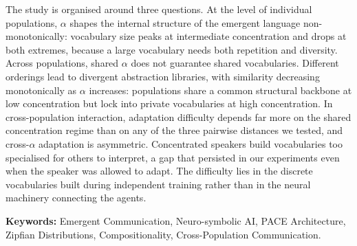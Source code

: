 The study is organised around three questions. At the level of individual populations, $\alpha$ shapes the internal structure of the emergent language non-monotonically: vocabulary size peaks at intermediate concentration and drops at both extremes, because a large vocabulary needs both repetition and diversity. Across populations, shared $\alpha$ does not guarantee shared vocabularies. Different orderings lead to divergent abstraction libraries, with similarity decreasing monotonically as $\alpha$ increases: populations share a common structural backbone at low concentration but lock into private vocabularies at high concentration. In cross-population interaction, adaptation difficulty depends far more on the shared concentration regime than on any of the three pairwise distances we tested, and cross-$\alpha$ adaptation is asymmetric. Concentrated speakers build vocabularies too specialised for others to interpret, a gap that persisted in our experiments even when the speaker was allowed to adapt. The difficulty lies in the discrete vocabularies built during independent training rather than in the neural machinery connecting the agents.

\vspace{1cm}
\noindent \textbf{Keywords:} Emergent Communication, Neuro-symbolic AI, PACE Architecture, Zipfian Distributions, Compositionality, Cross-Population Communication.